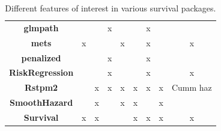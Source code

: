 \documentclass[
]{jss}
\begin{document}
\begin{table}[ht]
{\begin{tabular}{ccccccccc}
\textbf{glmpath} \cite{park_hastie}       &                          &                           & x                     &                  &                     & x                        &                                  &                                  \\
\textbf{mets} \cite{scheike2014estimating}           & x                        &                           &                       & x                &                     & x                        &                                  & x                                \\
\textbf{penalized} \cite{goeman_meijer2019}      &                          &                           & x                     &                  &                     & x                        &                                  &                                  \\
\textbf{RiskRegression} \cite{gerds_blanche} &                          &                           & x                     &                  &                     & x                        &                                  & x                                \\
\textbf{Rstpm2} \cite{clements_liu}         &                          & x                         & x                     & x                & x                   & x                        & x                                & Cumm haz                         \\
\textbf{SmoothHazard} \cite{smoothHazard}   &                          & x                         &                       & x                & x                   &                          & x                            &                                      \\
\textbf{Survival} \cite{survival-package}       & x                        & x                         &                       &                  & x                   & x                        & x                                & x                               
\end{tabular}%
}
\caption{Different features of interest in various survival packages.}
\label{tab:surv-pkgs}
\end{table}
\end{document}
